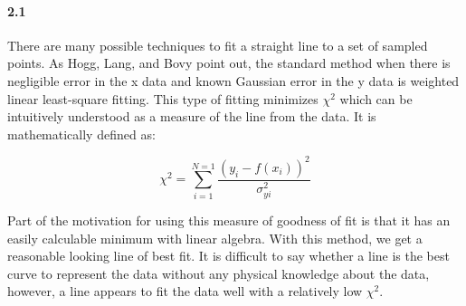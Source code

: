 \documentclass{article}
\begin{document}
\paragraph{2.1} There are many possible techniques to fit a straight line to a set of sampled
points. As Hogg, Lang, and Bovy point out, the standard method when there is negligible error in the x
data and known Gaussian error in the y data is weighted linear least-square fitting. This type of fitting minimizes $\chi ^2$ which can be intuitively understood as a measure of
the line from the data. It is mathematically defined as:

$$\chi ^2 = \sum_{i=1}^{N = 1} \frac{(y_i - f(x_i))^2}{\sigma_{yi}^2}$$

Part of the motivation for using this measure of goodness of fit is that it has an easily calculable
minimum with linear algebra. With this method, we get a reasonable looking line of best fit. It is
difficult to say whether a line is the best curve to represent the data without any physical
knowledge about the data, however, a line appears to fit the data well with a relatively low $\chi
^2$.
\end{document}
